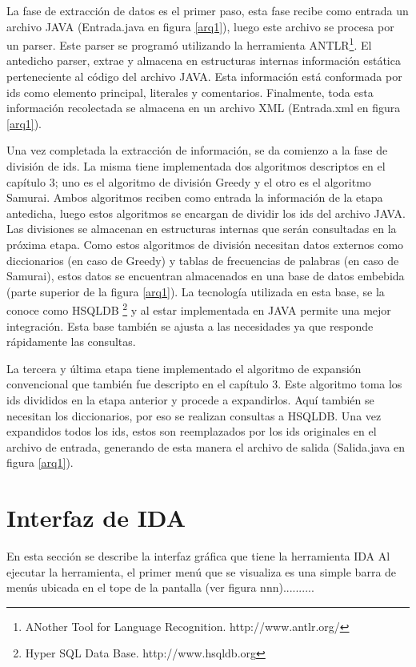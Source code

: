 \documentclass[a4paper,12pt]{report}
\begin{document}
La fase de extracción de datos es el primer paso, esta fase recibe como entrada un archivo JAVA (Entrada.java en figura \ref{arq1}), luego este archivo se procesa por un parser. Este parser se programó utilizando la herramienta ANTLR\footnote[2]{ANother Tool for Language Recognition. http://www.antlr.org/}. El antedicho parser, extrae y almacena en estructuras internas información estática perteneciente al código del archivo JAVA. Esta información está conformada por ids como elemento principal, literales y comentarios. Finalmente, toda esta información recolectada se almacena en un archivo XML (Entrada.xml en figura \ref{arq1}).

Una vez completada la extracción de información, se da comienzo a la fase de división de ids. La misma tiene implementada dos algoritmos descriptos en el capítulo 3; uno es el algoritmo de división Greedy y el otro es el algoritmo Samurai. Ambos algoritmos reciben como entrada la información de la etapa antedicha, luego estos algoritmos se encargan de dividir los ids del archivo JAVA. Las divisiones se almacenan en estructuras internas que serán consultadas en la próxima etapa. Como estos algoritmos de división necesitan datos externos como diccionarios (en caso de Greedy) y tablas de frecuencias de palabras (en caso de Samurai), estos datos se encuentran almacenados en una base de datos embebida (parte superior de la figura \ref{arq1}). La tecnología utilizada en esta base, se la conoce como HSQLDB \footnote[1]{Hyper SQL Data Base. http://www.hsqldb.org} y al estar implementada en JAVA permite una mejor integración. Esta base también se ajusta a las necesidades ya que responde rápidamente las consultas.

La tercera y última etapa tiene implementado el algoritmo de expansión convencional que también fue descripto en el capítulo 3. Este algoritmo toma los ids divididos en la etapa anterior y procede a expandirlos. Aquí también se necesitan los diccionarios, por eso se realizan consultas a HSQLDB. Una vez expandidos todos los ids, estos son reemplazados por los ids originales en el archivo de entrada, generando de esta manera el archivo de salida (Salida.java en figura \ref{arq1}).
 
\section{Interfaz de IDA}

En esta sección se describe la interfaz gráfica que tiene la herramienta IDA
Al ejecutar la herramienta, el primer menú que se visualiza es una simple barra de menús ubicada en el tope de la pantalla (ver figura nnn)..........




\end{document}
